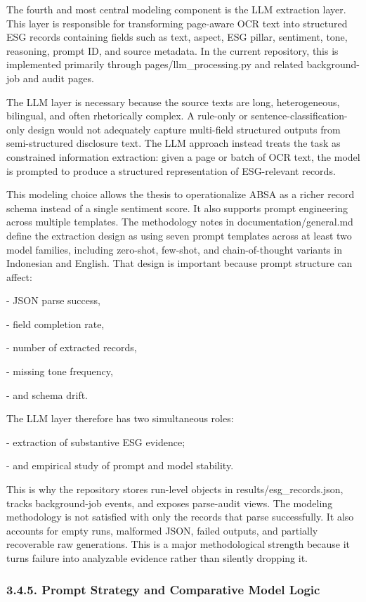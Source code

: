 \documentclass{article}
\begin{document}
The fourth and most central modeling component is the LLM extraction layer. This layer is responsible for transforming page-aware OCR text into structured ESG records containing fields such as text, aspect, ESG pillar, sentiment, tone, reasoning, prompt ID, and source metadata. In the current repository, this is implemented primarily through pages/llm\_processing.py and related background-job and audit pages.

The LLM layer is necessary because the source texts are long, heterogeneous, bilingual, and often rhetorically complex. A rule-only or sentence-classification-only design would not adequately capture multi-field structured outputs from semi-structured disclosure text. The LLM approach instead treats the task as constrained information extraction: given a page or batch of OCR text, the model is prompted to produce a structured representation of ESG-relevant records.

This modeling choice allows the thesis to operationalize ABSA as a richer record schema instead of a single sentiment score. It also supports prompt engineering across multiple templates. The methodology notes in documentation/general.md define the extraction design as using seven prompt templates across at least two model families, including zero-shot, few-shot, and chain-of-thought variants in Indonesian and English. That design is important because prompt structure can affect:

- JSON parse success,

- field completion rate,

- number of extracted records,

- missing tone frequency,

- and schema drift.

The LLM layer therefore has two simultaneous roles:

- extraction of substantive ESG evidence;

- and empirical study of prompt and model stability.

This is why the repository stores run-level objects in results/esg\_records.json, tracks background-job events, and exposes parse-audit views. The modeling methodology is not satisfied with only the records that parse successfully. It also accounts for empty runs, malformed JSON, failed outputs, and partially recoverable raw generations. This is a major methodological strength because it turns failure into analyzable evidence rather than silently dropping it.
\subsubsection*{ 3.4.5. Prompt Strategy and Comparative Model Logic}
\end{document}

